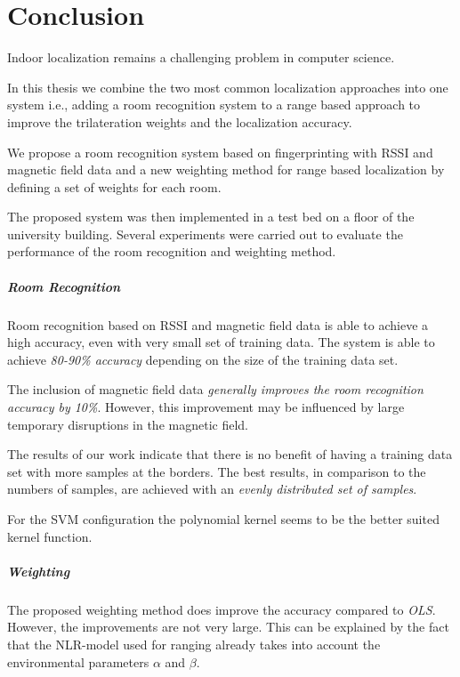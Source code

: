 \chapter{Conclusion}

\label{Chapter6}


Indoor localization remains a challenging problem in computer science.

In this thesis we combine the two most common localization approaches into one system i.e., adding a room recognition system to a range based approach to improve the trilateration weights and the localization accuracy.

We propose a room recognition system based on fingerprinting with RSSI and magnetic field data and a new weighting method for range based localization by defining a set of weights for each room.

The proposed system was then implemented in a test bed on a floor of the university building. Several experiments were carried out to evaluate the performance of the room recognition and weighting method.

\paragraph{Room Recognition}
Room recognition based on RSSI and magnetic field data is able to achieve a high accuracy, even with very small set of training data. The system is able to achieve \emph{80-90\% accuracy} depending on the size of the training data set.

The inclusion of magnetic field data \emph{generally improves the room recognition accuracy by 10\%}. However, this improvement may be influenced by large temporary disruptions in the magnetic field.

The results of our work indicate that there is no benefit of having a training data set with more samples at the borders. The best results, in comparison to the numbers of samples, are achieved with an \emph{evenly distributed set of samples}.

For the SVM configuration the polynomial kernel seems to be the better suited kernel function.


\paragraph{Weighting}

The proposed weighting method does improve the accuracy compared to \emph{OLS}. However, the improvements are not very large. This can be explained by the fact that the NLR-model used for ranging already takes into account the environmental parameters $\alpha$ and $\beta$.

